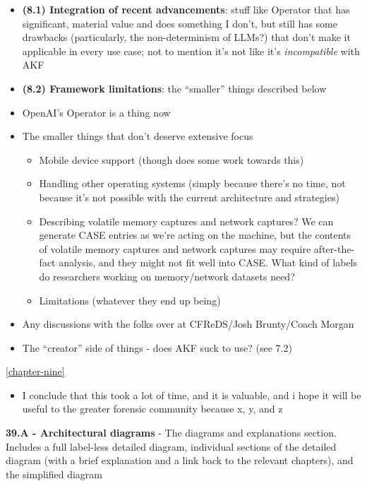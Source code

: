 \begin{itemize}
\item
  \textbf{(8.1) Integration of recent advancements}: stuff like Operator
  that has significant, material value and does something I don't, but
  still has some drawbacks (particularly, the non-determinism of LLMs?)
  that don't make it applicable in every use case; not to mention it's
  not like it's \emph{incompatible} with AKF
\item
  \textbf{(8.2) Framework limitations}: the ``smaller'' things described
  below
\item
  OpenAI's Operator is a thing now
\item
  The smaller things that don't deserve extensive focus

  \begin{itemize}
  \tightlist
  \item
    Mobile device support (though
    \cite{demmelDataSynthesisGoing2024} does some work towards this)
  \item
    Handling other operating systems (simply because there's no time,
    not because it's not possible with the current architecture and
    strategies)
  \item
    Describing volatile memory captures and network captures? We can
    generate CASE entries as we're acting on the machine, but the
    contents of volatile memory captures and network captures may
    require after-the-fact analysis, and they might not fit well into
    CASE. What kind of labels do researchers working on memory/network
    datasets need?
  \item
    Limitations (whatever they end up being)
  \end{itemize}
\item
  Any discussions with the folks over at CFReDS/Josh Brunty/Coach Morgan
\item
  The ``creator'' side of things - does AKF suck to use? (see 7.2)
\end{itemize}

\autoref{chapter-nine}

\begin{itemize}
\tightlist
\item
  I conclude that this took a lot of time, and it is valuable, and i
  hope it will be useful to the greater forensic community because x, y,
  and z
\end{itemize}

\textbf{39.A - Architectural diagrams} - The diagrams and explanations
section. Includes a full label-less detailed diagram, individual
sections of the detailed diagram (with a brief explanation and a link
back to the relevant chapters), and the simplified diagram
